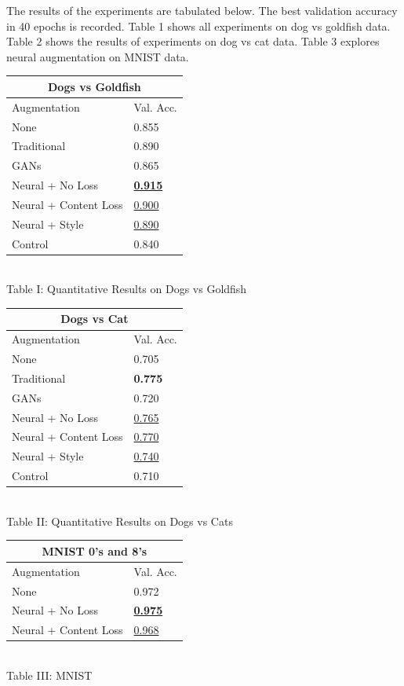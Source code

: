 \documentclass[10pt,twocolumn,letterpaper]{article}
\begin{document}
The results of the experiments are tabulated below. The best validation accuracy in 40 epochs is recorded. Table 1 shows all experiments on dog vs goldfish data. Table 2 shows the results of experiments on dog vs cat data. Table 3 explores neural augmentation on MNIST data. \\

\begin{center}
\begin{tabular}{ |p{4cm}||p{2cm}|  }
 \hline
 \multicolumn{2}{|c|}{Dogs vs Goldfish} \\
 \hline
 Augmentation & Val. Acc.\\
 \hline
None & 0.855 \\
Traditional   & 0.890  \\
GANs   & 0.865 \\
Neural + No Loss  & \underline{\textbf{0.915}}   \\
Neural + Content Loss & \underline{0.900}  \\
Neural + Style & \underline{0.890}  \\
Control & 0.840 \\
 \hline
\end{tabular}\\
Table I: Quantitative Results on Dogs vs Goldfish
\end{center}

\begin{center}
\begin{tabular}{ |p{4cm}||p{2cm}|  }
 \hline
 \multicolumn{2}{|c|}{Dogs vs Cat} \\
 \hline
 Augmentation & Val. Acc.\\
 \hline
None & 0.705 \\
Traditional   & \textbf{0.775}  \\
GANs   & 0.720 \\
Neural + No Loss  & \underline{0.765}    \\
Neural + Content Loss & \underline{0.770}  \\
Neural + Style & \underline{0.740}  \\
Control & 0.710 \\
 \hline
\end{tabular}\\
Table II: Quantitative Results on Dogs vs Cats
\end{center}

\begin{center}
\begin{tabular}{ |p{4cm}||p{2cm}|  }
 \hline
 \multicolumn{2}{|c|}{MNIST 0's and 8's} \\
 \hline
 Augmentation & Val. Acc.\\
 \hline
None & 0.972 \\
Neural + No Loss  & \textbf{\underline{0.975}}    \\
Neural + Content Loss & \underline{0.968}  \\
 \hline
\end{tabular}\\
Table III: MNIST
\end{center}
\end{document}
